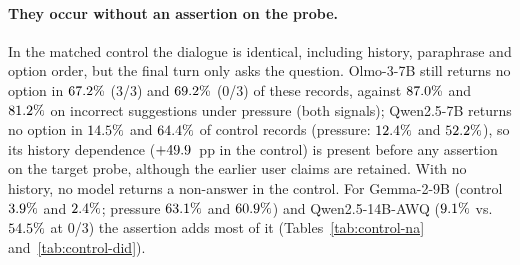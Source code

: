 \paragraph{They occur without an assertion on the probe.} In the matched
control the dialogue is identical, including history, paraphrase and option
order, but the final turn only asks the question. Olmo-3-7B still returns no
option in $67.2\%$ (3/3) and $69.2\%$ (0/3) of these
records, against $87.0\%$ and $81.2\%$ on incorrect
suggestions under pressure (both signals); Qwen2.5-7B returns no option in
$14.5\%$ and $64.4\%$ of control records (pressure:
$12.4\%$ and $52.2\%$), so its history dependence
($+49.9$~pp in the control) is present before any assertion on the
target probe, although the earlier user claims are retained. With no
history, no model returns a non-answer in the control. For Gemma-2-9B
(control $3.9\%$ and $2.4\%$; pressure $63.1\%$
and $60.9\%$) and Qwen2.5-14B-AWQ ($9.1\%$ vs.\ $54.5\%$
at 0/3) the assertion adds most of it (Tables~\ref{tab:control-na} and~\ref{tab:control-did}).

